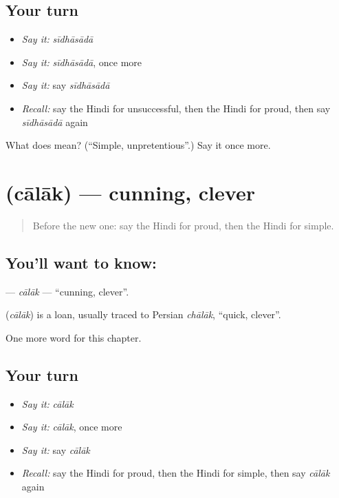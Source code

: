 \subsection*{Your turn}
\begin{itemize}
\raggedright
  \item \emph{Say it:} \emph{sīdhāsādā}
  \item \emph{Say it:} \emph{sīdhāsādā}, once more
  \item \emph{Say it:} say \emph{sīdhāsādā}
  \item \emph{Recall:} say the Hindi for unsuccessful, then the Hindi for proud, then say \emph{sīdhāsādā} again
\end{itemize}

\begin{tcolorbox}[breakable,colback=teal!4,colframe=teal!35!black,title={Before you move on}]
What does  mean? (\textquotedblleft{}Simple, unpretentious\textquotedblright{}.) Say it once more.
\end{tcolorbox}
\section[\texorpdfstring{\hi{चालाक} (cālāk)}{चालाक (cālāk)}]{ (cālāk) — cunning, clever}

\label{lesson:HI-C243-calak}



\begin{quote}
Before the new one: say the Hindi for proud, then the Hindi for simple.
\end{quote}

\subsection*{You'll want to know: }
\textbf{} — \emph{cālāk} — \textquotedblleft{}cunning, clever\textquotedblright{}.

\begin{cousinweb}
\textbf{} (\emph{cālāk}) is a loan, usually traced to Persian \emph{chālāk}, \textquotedblleft{}quick, clever\textquotedblright{}.
\end{cousinweb}

\begin{grammarlens}[title={What you've built}]
One more word for this chapter.
\end{grammarlens}

\subsection*{Your turn}
\begin{itemize}
\raggedright
  \item \emph{Say it:} \emph{cālāk}
  \item \emph{Say it:} \emph{cālāk}, once more
  \item \emph{Say it:} say \emph{cālāk}
  \item \emph{Recall:} say the Hindi for proud, then the Hindi for simple, then say \emph{cālāk} again
\end{itemize}

